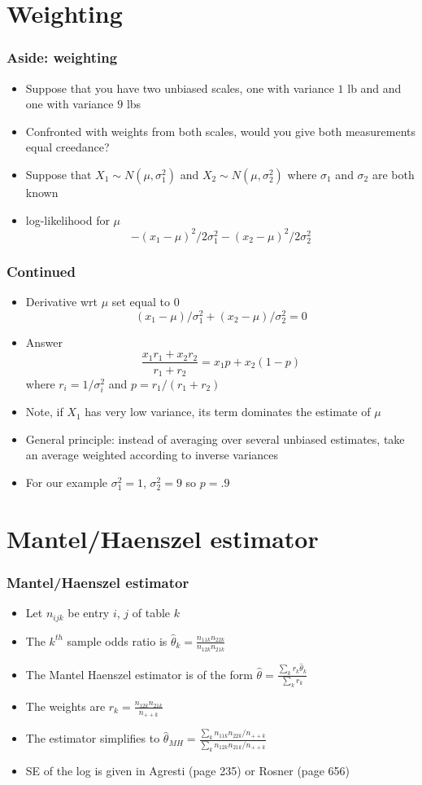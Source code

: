 \documentclass[aspectratio=169]{beamer}
\begin{document}
\section{Weighting}
\begin{frame}\frametitle{Aside: weighting}
\begin{itemize}
\item Suppose that you have two unbiased scales, one with variance $1$
  lb and and one with variance $9$ lbs
\item Confronted with weights from both scales, would you give both measurements
  equal creedance?
\item Suppose that $X_1 \sim N(\mu, \sigma_1^2)$ and $X_2 \sim N(\mu, \sigma_2^2)$
where $\sigma_1$ and $\sigma_2$ are both known
\item log-likelihood for $\mu$
  $$
  -(x_1 - \mu)^2 / 2\sigma_1^2 - (x_2 - \mu)^2 / 2\sigma_2^2
  $$
\end{itemize}
\end{frame}

\begin{frame}\frametitle{Continued}
\begin{itemize}
\item Derivative wrt $\mu$ set equal to 0
$$
(x_1 - \mu) / \sigma_1^2 + (x_2 - \mu) / \sigma_2^2 = 0 
$$
\item Answer $$\frac{x_1 r_1 + x_2r_2}{r_1 + r_2} = x_1 p + x_2 (1 - p)$$
where $r_i = 1/\sigma_i^2$ and $p = r_1 / (r_1 + r_2)$
\item Note, if $X_1$ has very low variance, its term dominates the estimate of $\mu$
\item General principle: instead of averaging over several unbiased estimates, take an average weighted according to inverse variances
\item For our example $\sigma_1^2 = 1$, $\sigma_2^2 = 9$ so $p = .9$
\end{itemize}
\end{frame}


\section{Mantel/Haenszel estimator}
\begin{frame}\frametitle{Mantel/Haenszel estimator}
\begin{itemize}
\item Let $n_{ijk}$ be entry $i$, $j$ of table $k$ 
\item  The $k^{th}$ sample odds ratio is $\hat \theta_k = \frac{n_{11k}n_{22k}}{n_{12k}n_{21k}}$
\item The Mantel Haenszel estimator is of the form $\hat \theta = \frac{\sum_k r_k \hat \theta_k}{\sum_k r_k}$
\item The weights are $r_k = \frac{n_{12k}n_{21k}}{n_{++k}}$
\item The estimator simplifies to $\hat \theta_{MH} = \frac{\sum_k n_{11k}n_{22k}/n_{++k}}{\sum_k n_{12k}n_{21k}/n_{++k}}$
\item SE of the log is given in Agresti (page 235) or Rosner (page 656)
\end{itemize}
\end{frame}
\end{document}

